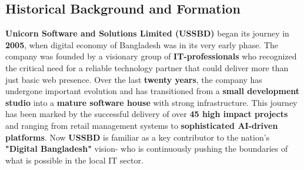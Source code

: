 \documentclass[oneside]{thesis-library}
\begin{document}
\subsection{Historical Background and Formation}
\textbf{Unicorn Software and Solutions Limited (USSBD)} began its journey in \textbf{2005}, when digital economy of Bangladesh was in its very early phase. The company was founded by a visionary group of \textbf{IT-professionals} who recognized the critical need for a reliable technology partner that could deliver more than just basic web presence. Over the last \textbf{twenty years}, the company has undergone important evolution and has transitioned from a \textbf{small development studio} into a \textbf{mature software house} with strong infrastructure. This journey has been marked by the successful delivery of over \textbf{45 high impact projects} and ranging from retail management systems to \textbf{sophisticated AI-driven platforms}. Now \textbf{USSBD} is familiar as a key contributor to the nation’s \textbf{"Digital Bangladesh"} vision- who is continuously pushing the boundaries of what is possible in the local IT sector.
\end{document}
